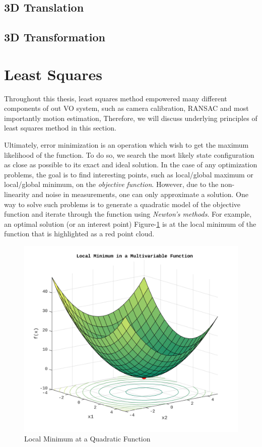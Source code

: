 \documentclass[a4paper]{report}
\numberwithin{figure}{section}
\begin{document}
\subsection{3D Translation}


\subsection{3D Transformation}

\section{Least Squares}\label{sc_least_squares}

Throughout this thesis, least squares method empowered many different components 
of out VO system, 
such as camera calibration, RANSAC and most importantly motion estimation, 
Therefore, we will discuss underlying principles of least squares method in this section.

Ultimately, error minimization is an 
operation which wish to get the maximum likelihood of the function. To do so,
we search the most
likely state configuration as close as possible to its exact and ideal solution. 
In the case of any optimization problems,
the goal is to find interesting points, such as local/global
maximum or local/global minimum, on the \textit{objective}
\textit{function}. However, due to the
non-linearity and noise in measurements, one can only approximate a solution.
One way to solve such problems is to generate a quadratic model of 
the objective function and iterate
through the function using \textit{Newton's methods}. 
For example,
an optimal solution (or an interest point)
Figure-\ref{fig:lsq_multivariable_function_example} is at the local
minimum of the function that is highlighted as a red point cloud.

\begin{figure}[H]
	\centering
	\includegraphics[width=\linewidth,natwidth=640,natheight=640]
	{fig/lsq_multivariable_function_example.jpg}
	\caption{Local Minimum at a Quadratic Function}
	\label{fig:lsq_multivariable_function_example}
\end{figure}
\end{document}
